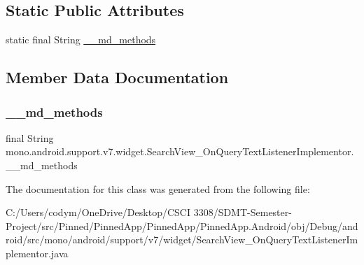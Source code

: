 \subsection*{Static Public Attributes}
\begin{DoxyCompactItemize}
\item 
static final String \hyperlink{classmono_1_1android_1_1support_1_1v7_1_1widget_1_1_search_view___on_query_text_listener_implementor_ae251e6ade13e5dd277fac9fdfb2113ff}{\+\_\+\+\_\+md\+\_\+methods}
\end{DoxyCompactItemize}


\subsection{Member Data Documentation}
\mbox{\label{classmono_1_1android_1_1support_1_1v7_1_1widget_1_1_search_view___on_query_text_listener_implementor_ae251e6ade13e5dd277fac9fdfb2113ff}} 
\subsubsection{\texorpdfstring{\+\_\+\+\_\+md\+\_\+methods}{\_\_md\_methods}}
{\footnotesize\ttfamily final String mono.\+android.\+support.\+v7.\+widget.\+Search\+View\+\_\+\+On\+Query\+Text\+Listener\+Implementor.\+\_\+\+\_\+md\+\_\+methods\hspace{0.3cm}{\ttfamily [static]}}



The documentation for this class was generated from the following file\+:\begin{DoxyCompactItemize}
\item 
C\+:/\+Users/codym/\+One\+Drive/\+Desktop/\+C\+S\+C\+I 3308/\+S\+D\+M\+T-\/\+Semester-\/\+Project/src/\+Pinned/\+Pinned\+App/\+Pinned\+App/\+Pinned\+App.\+Android/obj/\+Debug/android/src/mono/android/support/v7/widget/Search\+View\+\_\+\+On\+Query\+Text\+Listener\+Implementor.\+java\end{DoxyCompactItemize}
